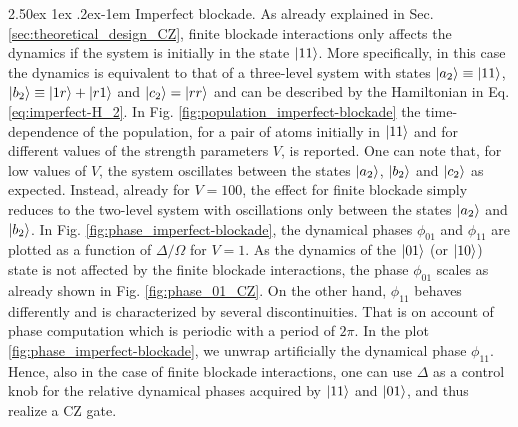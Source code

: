 \documentclass[rmp,10pt,onecolumn,fleqn,notitlepage]{revtex4-1}
\makeatletter
\renewcommand{\paragraph}{%
    \@startsection{paragraph}{4}%
    {\z@}{2.50ex \@plus 1ex \@minus .2ex}{-1em}%
    {\bf\sffamily}%
}
\makeatother
\begin{document}
\paragraph{Imperfect blockade.} As already explained in Sec. \ref{sec:theoretical_design_CZ}, finite blockade interactions only affects the dynamics if the system is initially in the state $\left\vert{11}\right\rangle$. More specifically, in this case the dynamics is equivalent to that of a three-level system with states $\left\vert{a_2}\right\rangle\equiv\left\vert{11}\right\rangle$, $\left\vert{b_2}\right\rangle\equiv \left\vert{1r}\right\rangle+\left\vert{r1}\right\rangle$ and $\left\vert{c_2}\right\rangle=\left\vert{rr}\right\rangle$ and can be described by the Hamiltonian in Eq. \eqref{eq:imperfect-H_2}. In Fig. \ref{fig:population_imperfect-blockade} the time-dependence of the population, for a pair of atoms initially in $\left\vert{11}\right\rangle$ and for different values of the strength parameters $V$, is reported. One can note that, for low values of $V$, the system oscillates between the states $\left\vert{a_2}\right\rangle$, $\left\vert{b_2}\right\rangle$ and $\left\vert{c_2}\right\rangle$ as expected. Instead, already for $V=100$, the effect for finite blockade simply reduces to the two-level system with oscillations only between the states $\left\vert{a_2}\right\rangle$ and $\left\vert{b_2}\right\rangle$. In Fig. \ref{fig:phase_imperfect-blockade}, the dynamical phases $\phi_{01}$ and $\phi_{11}$ are plotted as a function of $\Delta/\Omega$ for $V=1$. As the dynamics of the $\left\vert{01}\right\rangle$ (or $\left\vert{10}\right\rangle$) state is not affected by the finite blockade interactions, the phase $\phi_{01}$ scales as already shown in Fig. \ref{fig:phase_01_CZ}. 
On the other hand, $\phi_{11}$ behaves differently and is characterized by several discontinuities. That is on account of phase computation which is periodic with a period of $2\pi$. In the plot \ref{fig:phase_imperfect-blockade}, we unwrap artificially the dynamical phase $\phi_{11}$.  
Hence, also in the case of finite blockade interactions, one can use $\Delta$ as a control knob for the relative dynamical phases acquired by $\left\vert{11}\right\rangle$ and $\left\vert{01}\right\rangle$, and thus realize a CZ gate.
\end{document}
